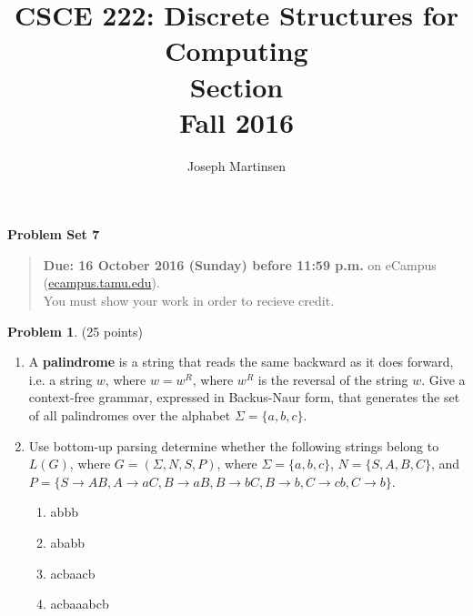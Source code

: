 \documentclass{article}
\title{CSCE 222: Discrete Structures for Computing\\Section \mysectionnumber\\Fall 2016}
\author{Joseph Martinsen}
\theoremstyle{definition}
\newtheorem{problem}{Problem}
\newcommand{\problemset}[1]{\begin{center}\textbf{Problem Set #1}\end{center}}
\newcommand{\duedate}[1]{\begin{quote}\textbf{Due: #1} on eCampus (\url{ecampus.tamu.edu}). \\You must show your work in order to recieve credit.\end{quote}}
\begin{document}
\maketitle

\problemset{7}

\duedate{16 October 2016 (Sunday) before 11:59 p.m.}

\bigskip

\begin{problem} (25 points)\\
\begin{enumerate}
\item A \textbf{palindrome} is a string that reads the same backward as it does forward, i.e. a string $w$, where $w=w^R$, where $w^R$ is the reversal of the string $w$.  Give a context-free grammar, expressed in Backus-Naur form, that generates the set of all palindromes over the alphabet $\Sigma=\{a,b,c\}$.
\item Use bottom-up parsing determine whether the following strings belong to $L(G)$, where $G=(\Sigma,N,S,P)$, where $\Sigma=\{a,b,c\}$, $N=\{S,A,B,C\}$, and $P=\{S\to AB,A\to aC,B\to aB, B\to bC, B\to b, C \to cb, C\to b\}$.
\begin{enumerate}
\item abbb
\item ababb
\item acbaacb
\item acbaaabcb
\end{enumerate}
\end{enumerate}
\end{problem}
\end{document}
